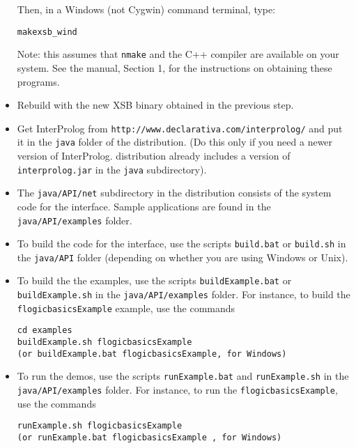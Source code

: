 \begin{itemize}
  Then, in a Windows (not Cygwin) command terminal, type:
\begin{verbatim}
makexsb_wind  
\end{verbatim}
  Note: this assumes that {\tt nmake} and the C++ compiler are available on
  your system. See the \FLORA manual, Section 1, for the instructions on
  obtaining these programs.
\item Rebuild \FLORA with the new XSB binary obtained in the
previous step.
\item Get InterProlog from {\tt http://www.declarativa.com/interprolog/}
and put it in the {\tt java}  folder of the \FLORA distribution.
(Do this only if you need a newer version of InterProlog. \FLORA
distribution already includes a version of {\tt interprolog.jar} in the
{\tt java} subdirectory).
\item The {\tt java/API/net} subdirectory in the \FLORA distribution
  consists of the system code for the interface.
  Sample applications are found in the {\tt java/API/examples}  folder.
\item To build the code for the interface, use the scripts {\tt build.bat} or
  {\tt build.sh} in the {\tt java/API}  folder (depending on whether you are
  using Windows or Unix).
\item To build the the examples, use the scripts
  {\tt buildExample.bat} or  {\tt buildExample.sh} in the {\tt java/API/examples}
  folder. For instance, to
  build the {\tt flogicbasicsExample} example, use the commands
\begin{verbatim}
cd examples
buildExample.sh flogicbasicsExample
(or buildExample.bat flogicbasicsExample, for Windows)
\end{verbatim}
\item To run the demos, use the scripts
{\tt runExample.bat} and  {\tt runExample.sh}  in the {\tt java/API/examples}
folder. For instance, to
run the {\tt flogicbasicsExample},  use the commands
\begin{verbatim}
runExample.sh flogicbasicsExample
(or runExample.bat flogicbasicsExample , for Windows)
\end{verbatim}
\end{itemize}



